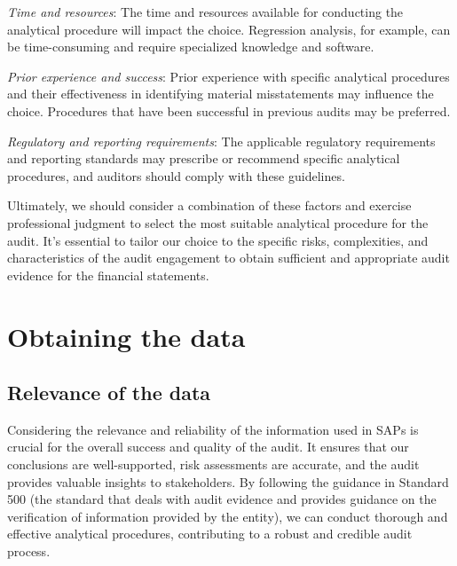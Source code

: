 \begin{compactitem}
\item \textit{Time and resources}: The time and resources available for conducting the analytical procedure will impact the choice. Regression analysis, for example, can be time-consuming and require specialized knowledge and software.

\item \textit{Prior experience and success}: Prior experience with specific ana\-lyt\-i\-cal procedures and their effectiveness in identifying material mis\-state\-ments may influence the choice. Procedures that have been successful in previous audits may be preferred.

\item \textit{Regulatory and reporting requirements}: The applicable regulatory requirements and reporting standards may prescribe or recommend specific analytical procedures, and auditors should comply with these guidelines.

\end{compactitem}

\bigskip
Ultimately, we should consider a combination of these factors and exercise professional judgment to select the most suitable analytical procedure for the audit. It's essential to tailor our choice to the specific risks, complexities, and characteristics of the audit engagement to obtain sufficient and appropriate audit evidence for the financial statements.



\section{Obtaining the data} %
\label{sec:relevance_and_reliability_of_the_data}

\subsection{Relevance of the data} %
\label{sub:relevance_of_the_data}

Considering the relevance and reliability of the information used in SAPs is crucial for the overall success and quality of the audit. It ensures that our conclusions are well-supported, risk assessments are accurate, and the audit provides valuable insights to stakeholders. By following the guidance in Standard 500 (the standard that deals with audit evidence and provides guidance on the verification of information provided by the entity), we can conduct thorough and effective analytical procedures, contributing to a robust and credible audit process.

